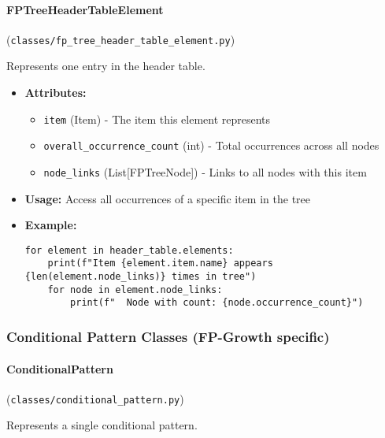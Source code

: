 \documentclass[
english,
smallborders
]{i6prcsht}
\begin{document}
\vspace*{0.3cm}

\paragraph{FPTreeHeaderTableElement} (\texttt{classes/fp\_tree\_header\_table\_element.py})

Represents one entry in the header table.

\begin{itemize}
	\item \textbf{Attributes:}
	      \begin{itemize}
		      \item \texttt{item} (Item) - The item this element represents
		      \item \texttt{overall\_occurrence\_count} (int) - Total occurrences across all nodes
		      \item \texttt{node\_links} (List[FPTreeNode]) - Links to all nodes with this item
	      \end{itemize}
	\item \textbf{Usage:} Access all occurrences of a specific item in the tree
	\item \textbf{Example:}
	      \begin{lstlisting}
for element in header_table.elements:
    print(f"Item {element.item.name} appears {len(element.node_links)} times in tree")
    for node in element.node_links:
        print(f"  Node with count: {node.occurrence_count}")
    \end{lstlisting}
\end{itemize}

\vspace*{0.3cm}

\vspace*{0.5cm}

\subsubsection*{Conditional Pattern Classes (FP-Growth specific)}

\paragraph{ConditionalPattern} (\texttt{classes/conditional\_pattern.py})

Represents a single conditional pattern.
\end{document}
